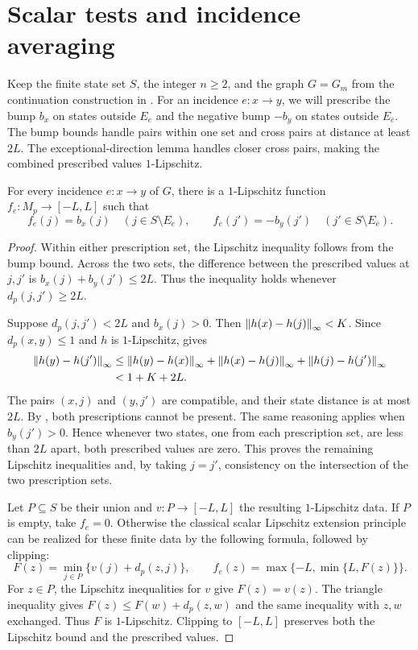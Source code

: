 \section{Scalar tests and incidence averaging}\label{sec:tests}

Keep the finite state set $S$, the integer $n\ge2$, and the graph
$G=G_m$ from the continuation construction in .
For an incidence $e:x\to y$, we will prescribe the bump $b_x$ on
states outside $E_e$ and the negative bump $-b_y$ on states outside
$E_{\bar e}$. The bump bounds handle pairs within one set and cross pairs
at distance at least $2L$. The exceptional-direction lemma handles closer
cross pairs, making the combined prescribed values $1$-Lipschitz.

\begin{lemma}\label{lem:edge-test}
For every incidence $e:x\to y$ of $G$, there is a $1$-Lipschitz
function $f_e:M_p\to[-L,L]$ such that
\[
 f_e(j)=b_x(j)\quad(j\in S\setminus E_e),\qquad
 f_e(j')=-b_y(j')\quad(j'\in S\setminus E_{\bar e}).
\]
\end{lemma}

\begin{proof}
Within either prescription set, the Lipschitz inequality follows from
the bump bound. Across the two sets, the difference between the
prescribed values at $j,j'$ is
$b_x(j)+b_y(j')\le2L$. Thus the inequality holds whenever
$d_p(j,j')\ge2L$.

Suppose $d_p(j,j')<2L$ and $b_x(j)>0$. Then
$\left\|h(x)-h(j)\right\|_\infty<K$. Since $d_p(x,y)\le1$ and $h$ is
$1$-Lipschitz,  gives
\[
 \begin{split}
 \left\|h(y)-h(j')\right\|_\infty
 &\le\left\|h(y)-h(x)\right\|_\infty
       +\left\|h(x)-h(j)\right\|_\infty
       +\left\|h(j)-h(j')\right\|_\infty\\
 &<1+K+2L.
 \end{split}
\]
The pairs $(x,j)$ and $(y,j')$ are compatible, and their state distance
is at most $2L$. By , both
prescriptions cannot be present. The same reasoning applies when
$b_y(j')>0$. Hence whenever two states, one from each prescription set,
are less than $2L$ apart, both prescribed values are zero. This proves
the remaining Lipschitz inequalities and, by taking $j=j'$, consistency
on the intersection of the two prescription sets.

Let $P\subseteq S$ be their union and $v:P\to[-L,L]$ the resulting
$1$-Lipschitz data. If $P$ is empty, take $f_e=0$. Otherwise the
classical scalar Lipschitz extension principle \cite{McShane34}
can be realized for these finite data by the following formula,
followed by clipping:
\[
 F(z)=\min_{j\in P}\{v(j)+d_p(z,j)\},\qquad
 f_e(z)=\max\{-L,\min\{L,F(z)\}\}.
\]
For $z\in P$, the Lipschitz inequalities for $v$ give $F(z)=v(z)$.
The triangle inequality gives $F(z)\le F(w)+d_p(z,w)$ and the
same inequality with $z,w$ exchanged. Thus $F$ is $1$-Lipschitz.
Clipping to $[-L,L]$ preserves both the Lipschitz bound and the
prescribed values.
\end{proof}

